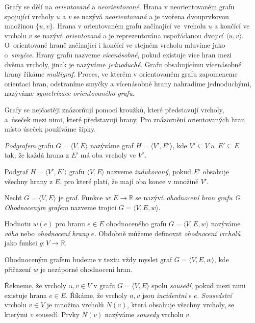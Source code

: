 \documentclass[
  program=infoi,
  biblatex=true,
  figures=true,
  glossaries=false,
  index,
  sourcecodes=true
]{kidiplom}
\begin{document}
Grafy se dělí na \textit{orientované} a \textit{neorientované}. Hrana v neorientovaném grafu spojující vrcholy $u$ a $v$ se nazývá \textit{neorientovaná} a je tvořena dvouprvkovou množinou $ \{ u, v \} $. Hrana v orientovaném grafu začínající ve~vrcholu $u$ a končící ve vrcholu $v$ se nazývá \textit{orientovaná} a je reprezentována uspořádanou dvojicí $\langle u, v \rangle$. O~orientované hraně začínající i končící ve stejném vrcholu mluvíme jako o~\textit{smyčce}. Hrany grafu nazveme \textit{vícenásobné}, pokud existuje více hran mezi dvěma vrcholy, jinak je nazýváme \textit{jednoduché}. Grafu obsahujícímu vícenásobné hrany říkáme \textit{multigraf}. Proces, ve kterém v orientovaném grafu zapomeneme orientaci hran, odstraníme smyčky a vícenásobné hrany nahradíme jednoduchými, nazýváme \textit{symetrizace orientovaného grafu}.

Grafy se nejčastěji znázorňují pomocí kroužků, které představují vrcholy, a~úseček mezi nimi, které představují hrany. Pro znázornění orientovaných hran místo úseček používáme šipky.

\begin{definition}[Podgraf]
\textit{Podgrafem} grafu $G = \langle V,E\rangle$ nazýváme graf $H = \langle V',E'\rangle$, kde $V' \subseteq V$ a~$E' \subseteq E$ tak, že každá hrana z $E'$ má oba vrcholy ve $V'$. 
\end{definition}

Podgraf $H = \langle V',E'\rangle$ grafu $\langle V,E\rangle$ nazveme \textit{indukovaný}, pokud $E'$ obsahuje všechny hrany z $E$, pro které platí, že mají oba konce v množině $V'$.

\begin{definition}
Nechť $G = \langle V,E\rangle$ je graf. Funkce $w:E \to \mathbb{R}$ se nazývá \textit{ohodnocení hran grafu G}. \textit{Ohodnoceným grafem} nazveme trojici $G = \langle V,E,w\rangle$.
\end{definition}

Hodnotu $w(e)$ pro hranu $e \in E$ ohodnoceného grafu $G = \langle V,E,w\rangle$ nazýváme \textit{váha} nebo \textit{ohodnocení hrany} $e$. Obdobně můžeme definovat \textit{ohodnocení vrcholů} jako funkci $g:V \to \mathbb{R}$.

\begin{remark}
Ohodnoceným grafem budeme v textu vždy myslet graf $G = \langle V,E,w\rangle$, kde přiřazení $w$ je nezáporné ohodnocení hran.
\end{remark}

\begin{definition}[Sousedství]
Řekneme, že vrcholy $u,v \in V$ v grafu $G = \langle V,E\rangle$ spolu \textit{sousedí}, pokud mezi nimi existuje hrana  $e \in E$. Říkáme, že vrcholy $u,v$ jsou \textit{incidentní} s $e$. \textit{Sousedství} vrcholu $v \in V$ je množina vrcholů $N(v)$, která obsahuje všechny vrcholy, se kterými $v$ sousedí. Prvky $N(v)$ nazýváme \textit{sousedy} vrcholu $v$.
\end{definition}
\end{document}

